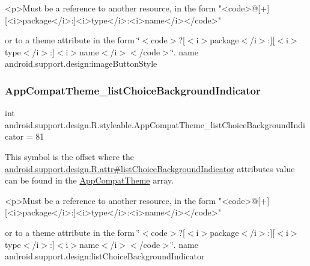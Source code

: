 \begin{DoxyVerb}      <p>Must be a reference to another resource, in the form "<code>@[+][<i>package</i>:]<i>type</i>:<i>name</i></code>"
\end{DoxyVerb}
 or to a theme attribute in the form \char`\"{}$<$code$>$?\mbox{[}$<$i$>$package$<$/i$>$\+:\mbox{]}\mbox{[}$<$i$>$type$<$/i$>$\+:\mbox{]}$<$i$>$name$<$/i$>$$<$/code$>$\char`\"{}.  name android.\+support.\+design\+:image\+Button\+Style \mbox{\label{classandroid_1_1support_1_1design_1_1R_1_1styleable_a1818805fc2d169ac39a9c5c20b3cec4f}} 
\subsubsection{\texorpdfstring{App\+Compat\+Theme\+\_\+list\+Choice\+Background\+Indicator}{AppCompatTheme\_listChoiceBackgroundIndicator}}
{\footnotesize\ttfamily int android.\+support.\+design.\+R.\+styleable.\+App\+Compat\+Theme\+\_\+list\+Choice\+Background\+Indicator = 81\hspace{0.3cm}{\ttfamily [static]}}

This symbol is the offset where the \hyperlink{classandroid_1_1support_1_1design_1_1R_1_1attr_a95c2e375c8509ef7555a7d818d499bfd}{android.\+support.\+design.\+R.\+attr\#list\+Choice\+Background\+Indicator} attribute\textquotesingle{}s value can be found in the \hyperlink{classandroid_1_1support_1_1design_1_1R_1_1styleable_afb351dc8de20cbd4c89abe360373010c}{App\+Compat\+Theme} array.

\begin{DoxyVerb}      <p>Must be a reference to another resource, in the form "<code>@[+][<i>package</i>:]<i>type</i>:<i>name</i></code>"
\end{DoxyVerb}
 or to a theme attribute in the form \char`\"{}$<$code$>$?\mbox{[}$<$i$>$package$<$/i$>$\+:\mbox{]}\mbox{[}$<$i$>$type$<$/i$>$\+:\mbox{]}$<$i$>$name$<$/i$>$$<$/code$>$\char`\"{}.  name android.\+support.\+design\+:list\+Choice\+Background\+Indicator \mbox{\label{classandroid_1_1support_1_1design_1_1R_1_1styleable_a05b88d6115e3a28d5aa99a5d7c9aaace}} 

